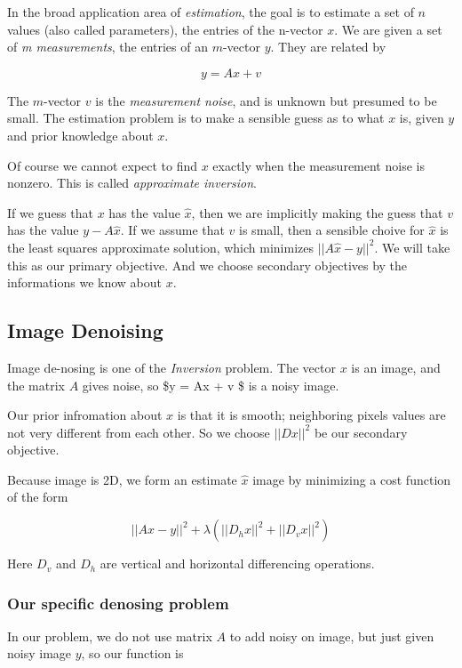 \documentclass[11pt]{article}
\begin{document}
In the broad application area of \emph{estimation}, the goal is to
estimate a set of \(n\) values (also called parameters), the entries of
the n-vector \(x\). We are given a set of \emph{m measurements}, the
entries of an \(m\)-vector \(y\). They are related by

\[ y = Ax + v \]

The \(m\)-vector \(v\) is the \emph{measurement noise}, and is unknown
but presumed to be small. The estimation problem is to make a sensible
guess as to what \(x\) is, given \(y\) and prior knowledge about \(x\).

Of course we cannot expect to find \(x\) exactly when the measurement
noise is nonzero. This is called \emph{approximate inversion}.

If we guess that \(x\) has the value \(\hat{x}\), then we are implicitly
making the guess that \(v\) has the value \(y - A\hat{x}\). If we assume
that \(v\) is small, then a sensible choive for \(\hat{x}\) is the least
squares approximate solution, which minimizes \(||A\hat{x}-y||^{2}\). We
will take this as our primary objective. And we choose secondary
objectives by the informations we know about \(x\).

\subsection{Image Denoising}\label{image-denoising-1}

Image de-nosing is one of the \emph{Inversion} problem. The vector \(x\)
is an image, and the matrix \(A\) gives noise, so \$y = Ax + v \$ is a
noisy image.

Our prior infromation about \(x\) is that it is smooth; neighboring
pixels values are not very different from each other. So we choose
\(||Dx||^2\) be our secondary objective.

Because image is 2D, we form an estimate \(\hat{x}\) image by minimizing
a cost function of the form

\[||Ax - y||^2 + \lambda (||D_{h}x||^{2} + ||D_{v}x||^{2}) \]

Here \(D_{v}\) and \(D_{h}\) are vertical and horizontal differencing
operations.

\subsubsection{Our specific denosing
problem}\label{our-specific-denosing-problem}

In our problem, we do not use matrix \(A\) to add noisy on image, but
just given noisy image \(y\), so our function is
\end{document}
